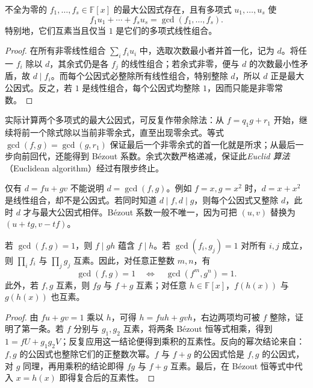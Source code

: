 \begin{theorem}
\label{thm:poly-bezout}
不全为零的 $f_1,\ldots,f_s\in\mathbb F[x]$ 的最大公因式存在，且有多项式 $u_1,\ldots,u_s$ 使
\begin{equation}
\label{eq:poly-bezout}
    f_1u_1+\cdots+f_su_s=\gcd(f_1,\ldots,f_s).
\end{equation}
特别地，它们互素当且仅当 $1$ 是它们的多项式线性组合。
\end{theorem}
\begin{proof}
在所有非零线性组合 $\sum_i f_iu_i$ 中，选取次数最小者并首一化，记为 $d$。将任一 $f_i$ 除以 $d$，其余式仍是各 $f_j$ 的线性组合；若余式非零，便与 $d$ 的次数最小性矛盾，故 $d\mid f_i$。而每个公因式必整除所有线性组合，特别整除 $d$，所以 $d$ 正是最大公因式。反之，若 $1$ 是线性组合，每个公因式均整除 $1$，因而只能是非零常数。
\end{proof}

实际计算两个多项式的最大公因式，可反复作带余除法：从 $f=q_1g+r_1$ 开始，继续将前一个除式除以当前非零余式，直至出现零余式。等式 $\gcd(f,g)=\gcd(g,r_1)$ 保证最后一个非零余式的首一化就是所求；从最后一步向前回代，还能得到 Bézout 系数。余式次数严格递减，保证此\emph{Euclid 算法}（Euclidean algorithm）经过有限步终止。

\begin{remark}
仅有 $d=fu+gv$ 不能说明 $d=\gcd(f,g)$。例如 $f=x,g=x^2$ 时，$d=x+x^2$ 是线性组合，却不是公因式。若同时知道 $d\mid f,d\mid g$，则每个公因式又整除 $d$，此时 $d$ 才与最大公因式相伴。Bézout 系数一般不唯一，因为可把 $(u,v)$ 替换为 $(u+tg,v-tf)$。
\end{remark}

\begin{proposition}
\label{prop:poly-coprime-rules}
若 $\gcd(f,g)=1$，则 $f\mid gh$ 蕴含 $f\mid h$。若 $\gcd(f_i,g_j)=1$ 对所有 $i,j$ 成立，则 $\prod_i f_i$ 与 $\prod_j g_j$ 互素。因此，对任意正整数 $m,n$，有
\[
    \gcd(f,g)=1\quad\Longleftrightarrow\quad \gcd(f^m,g^n)=1.
\]
此外，若 $f,g$ 互素，则 $fg$ 与 $f+g$ 互素；对任意 $h\in\mathbb F[x]$，$f(h(x))$ 与 $g(h(x))$ 也互素。
\end{proposition}
\begin{proof}
由 $fu+gv=1$ 乘以 $h$，可得 $h=fuh+gvh$，右边两项均可被 $f$ 整除，证明了第一条。若 $f$ 分别与 $g_1,g_2$ 互素，将两条 Bézout 恒等式相乘，得到 $1=fU+g_1g_2V$；反复应用这一结论便得到乘积的互素性。反向的幂次结论来自：$f,g$ 的公因式也整除它们的正整数次幂。$f$ 与 $f+g$ 的公因式恰是 $f,g$ 的公因式，对 $g$ 同理，再用乘积的结论即得 $fg$ 与 $f+g$ 互素。最后，在 Bézout 恒等式中代入 $x=h(x)$ 即得复合后的互素性。
\end{proof}

